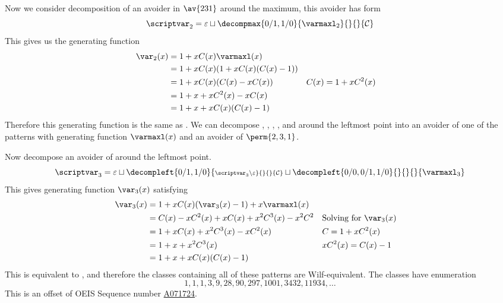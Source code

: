 Now we consider decomposition of an avoider
  in \(\av{231}\) around the maximum,
this avoider has form
\begin{equation*}
    \scriptvar_2 = \varepsilon \sqcup
    \decompmax{0/1,1/0}{\mathcal{\varmaxl}_2}{}{}{\mathcal{C}}
\end{equation*}
This gives us the generating function
\begin{equation*}
    \begin{aligned}
        \var_2(x) &= 1+xC(x)\varmaxl(x)\\
        &= 1+xC(x)(1+xC(x)(C(x)-1))\\
        &= 1 +xC(x)(C(x)-xC(x)) && C(x) = 1+xC^2(x)\\
        &= 1 +x + xC^2(x) - xC(x) \\
        &= 1 +x + xC(x)(C(x)-1)
    \end{aligned}
\end{equation*}
Therefore this generating function is the same as .
We can decompose
,
,
,
,
and  around the leftmost point
into an avoider of one of the patterns with generating function \(\varmaxl(x)\) and
an avoider of \(\perm{2,3,1}\).

Now decompose an avoider of 
around the leftmost point.
\begin{equation*}
    \scriptvar_3 = \varepsilon \sqcup
    \decompleft{0/1,1/0}{\scriptstyle \scriptvar_3\setminus\varepsilon}{}{}{\mathcal{C}}
    \sqcup \decompleft{0/0,0/1,1/0}{}{}{}{\varmaxl_3}
\end{equation*}
This gives generating function \(\var_3(x)\) satisfying
\begin{equation*}
    \begin{aligned}
        \var_3(x) &= 1 +xC(x)(\var_3(x)-1) + x\varmaxl(x)\\
        &= C(x) - xC^2(x) + xC(x) +x^2C^3(x) - x^2C^2 && \text{Solving for \(\var_3(x)\)}\\
        &= 1 + xC(x) +x^2C^3(x)-xC^2(x) && C = 1+xC^2(x)\\
        &= 1 + x + x^2C^3(x) && xC^2(x) = C(x)-1\\
        &= 1 + x + xC(x)(C(x)-1)
    \end{aligned}
\end{equation*}
This is equivalent to , and therefore
the classes containing all of these patterns are Wilf-equivalent.
The classes have enumeration
\begin{equation*}
    1, 1, 1, 3, 9, 28, 90, 297, 1001, 3432, 11934,\dotsc
\end{equation*}
This is an offset of OEIS Sequence number \href{http://oeis.org/A071724}{A071724}.

